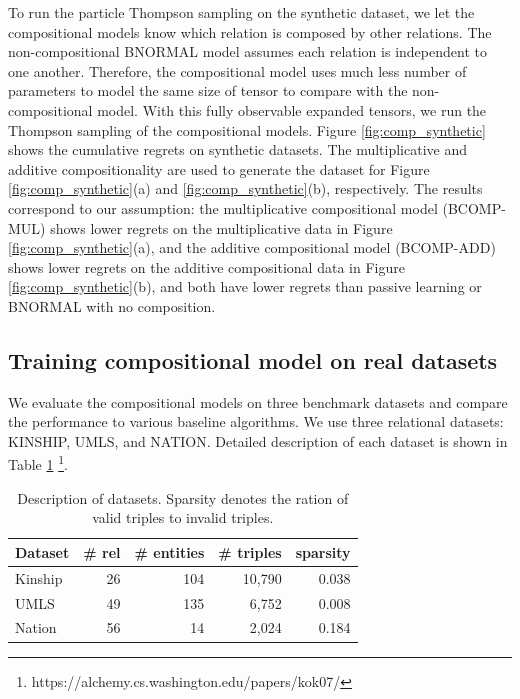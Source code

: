 To run the particle Thompson sampling on the synthetic dataset, we let the 
compositional models know which relation is composed by other relations. 
The non-compositional BNORMAL model assumes each relation is independent to one another. 
Therefore, the compositional model uses much less number of parameters to model 
the same size of tensor to compare with the non-compositional model. 
With this fully observable expanded tensors, we run the Thompson sampling of 
the compositional models.
Figure \ref{fig:comp_synthetic} shows the cumulative regrets on synthetic 
datasets. The multiplicative and additive compositionality are used to 
generate the dataset for Figure \ref{fig:comp_synthetic}(a) and 
\ref{fig:comp_synthetic}(b), respectively. The results correspond to our 
assumption: the multiplicative compositional model (BCOMP-MUL) shows lower 
regrets on the multiplicative data in Figure \ref{fig:comp_synthetic}(a), and 
the additive compositional model (BCOMP-ADD) shows lower regrets on the 
additive compositional data in Figure \ref{fig:comp_synthetic}(b), 
and both have lower regrets than passive learning or BNORMAL with no composition. 

\subsection{Training compositional model on real datasets}
We evaluate the compositional models on three benchmark datasets and compare the performance to various baseline 
algorithms. We use three relational datasets: KINSHIP, UMLS, and NATION. Detailed description of each 
dataset is shown in Table \ref{tbl:dataset} \footnote{https://alchemy.cs.washington.edu/papers/kok07/}.

\begin{table}[t]
\centering
\caption{\label{tbl:dataset}Description of datasets. 
Sparsity denotes the ration of valid triples to invalid triples.}
\vskip 0.15in
\begin{tabular}{l | r | r | r | r}
Dataset &  \# rel & \# entities & \# triples & sparsity \\ \hline
Kinship & 26 & 104  & 10,790 & 0.038 \\
UMLS & 49 &135  & 6,752 & 0.008 \\
Nation & 56 & 14  & 2,024 & 0.184 \\
\end{tabular}
\end{table}


